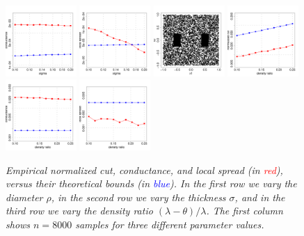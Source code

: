 \documentclass[11pt,twoside]{article}
\newcommand{\1}{\mathbf{1}}
\begin{document}
\begin{figure}[htb]
	\includegraphics[width=0.24\textwidth]{plots/experiment_1/sigma/conductance.pdf}
	\includegraphics[width=0.24\textwidth]{plots/experiment_1/sigma/local_spread.pdf}
	\includegraphics[width=0.24\textwidth]{plots/experiment_1/density_ratio/samples3.pdf}
	\includegraphics[width=0.24\textwidth]{plots/experiment_1/density_ratio/normalized_cut.pdf}
	\includegraphics[width=0.24\textwidth]{plots/experiment_1/density_ratio/conductance.pdf}
	\includegraphics[width=0.24\textwidth]{plots/experiment_1/density_ratio/local_spread.pdf}
	\caption{\it\small Empirical normalized cut, conductance, and local spread (in \textcolor{red}{red}), versus their theoretical bounds (in \textcolor{blue}{blue}). In the first row we vary the diameter $\rho$, in the second row we vary the thickness $\sigma$, and in the third row we vary the density ratio $(\lambda - \theta)/\lambda$. The first column shows $n = 8000$ samples for three different parameter values.}
	\label{fig:bounds}
\end{figure}
\end{document}
